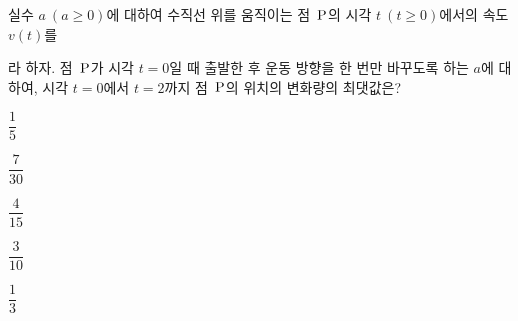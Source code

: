 실수 $a\ (a\ge 0)$에 대하여 수직선 위를 움직이는 점~$\mathrm{P}$의 시각 $t\ (t\ge 0)$에서의 속도 $v(t)$를 \par\smallskip{}\par\smallskip\noindent 라 하자. 점~$\mathrm{P}$가 시각 $t=0$일 때 출발한 후 운동 방향을 한 번만 바꾸도록 하는 $a$에 대하여, 시각 $t=0$에서 $t=2$까지 점~$\mathrm{P}$의 위치의 변화량의 최댓값은?
\begin{choices32}{\rule[-3ex]{0pt}{8ex}$\dfrac{1}{5}$}{\rule[-3ex]{0pt}{8ex}$\dfrac{7}{30}$}{\rule[-3ex]{0pt}{8ex}$\dfrac{4}{15}$}{\rule[-3ex]{0pt}{8ex}$\dfrac{3}{10}$}{\rule[-3ex]{0pt}{8ex}$\dfrac{1}{3}$}\end{choices32}
